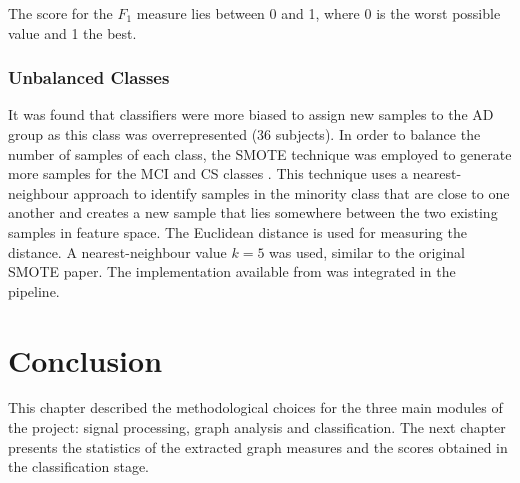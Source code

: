 		The score for the \(F_1\) measure lies between 0 and 1, where 0 is the worst possible value and 1 the best.

		\subsubsection{Unbalanced Classes}

		It was found that classifiers were more biased to assign new samples to the \ac{AD} group as this class was overrepresented (36 subjects). In order to balance the number of samples of each class, the \ac{SMOTE} technique was employed to generate more samples for the \ac{MCI} and \ac{CS} classes \autocite{Chawla:2002:SSM:1622407.1622416}. This technique uses a nearest-neighbour approach to identify samples in the minority class that are close to one another and creates a new sample that lies somewhere between the two existing samples in feature space. The Euclidean distance is used for measuring the distance. A nearest-neighbour value \(k = 5\) was used, similar to the original \ac{SMOTE} paper. The implementation available from \textcite{JeschkiesSMOTE} was integrated in the pipeline. 


\section*{Conclusion}
	This chapter described the methodological choices for the three main modules of the project: signal processing, graph analysis and classification. The next chapter presents the statistics of the extracted graph measures and the scores obtained in the classification stage. 
